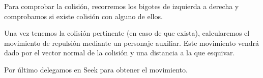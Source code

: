  Para comprobar la colisión, recorremos los bigotes de izquierda a derecha y comprobamos si existe colisión con alguno de ellos.
 
 Una vez tenemos la colisión pertinente (en caso de que exista), calcularemos el movimiento de repulsión mediante un personaje auxiliar. Este movimiento vendrá dado por el vector normal de la colisión y una distancia a la que esquivar.
 
  
  
  Por último delegamos en Seek para obtener el movimiento.
  
   
